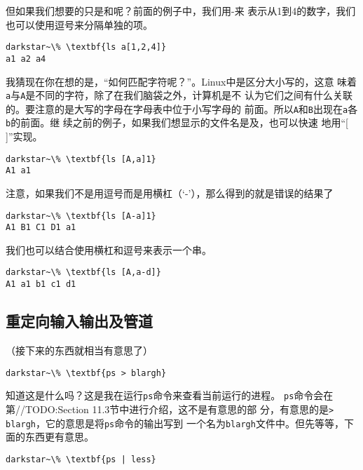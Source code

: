 但如果我们想要的只是和呢？前面的例子中，我们用-来
表示从1到4的数字，我们也可以使用逗号来分隔单独的项。
\begin{Verbatim}[frame=single, commandchars=\\\{\}]
darkstar~\% \textbf{ls a[1,2,4]}
a1 a2 a4
\end{Verbatim}

我猜现在你在想的是，``如何匹配字符呢？''。Linux中是区分大小写的，这意
味着\texttt{a}与\texttt{A}是不同的字符，除了在我们脑袋之外，计算机是不
认为它们之间有什么关联的。要注意的是大写的字母在字母表中位于小写字母的
前面。所以\texttt{A}和\texttt{B}出现在\texttt{a}各\texttt{b}的前面。继
续之前的例子，如果我们想显示的文件名是及，也可以快速
地用``[ ]''实现。
\begin{Verbatim}[frame=single, commandchars=\\\{\}]
darkstar~\% \textbf{ls [A,a]1}
A1 a1
\end{Verbatim}

注意，如果我们不是用逗号而是用横杠（`-'），那么得到的就是错误的结果了

\begin{Verbatim}[frame=single, commandchars=\\\{\}]
darkstar~\% \textbf{ls [A-a]1}
A1 B1 C1 D1 a1
\end{Verbatim}

我们也可以结合使用横杠和逗号来表示一个串。

\begin{Verbatim}[frame=single, commandchars=\\\{\}]
darkstar~\% \textbf{ls [A,a-d]}
A1 a1 b1 c1 d1
\end{Verbatim}


\subsection{重定向输入输出及管道}
\label{sec:shell:commandLine:redirectionAndPiping}
（接下来的东西就相当有意思了）
\begin{Verbatim}[frame=single, commandchars=\\\{\}]
darkstar~\% \textbf{ps > blargh}
\end{Verbatim}

知道这是什么吗？这是我在运行\texttt{ps}命令来查看当前运行的进程。
\texttt{ps}命令会在第//TODO:Section 11.3节中进行介绍，这不是有意思的部
分，有意思的是\texttt{> blargh}，它的意思是将\texttt{ps}命令的输出写到
一个名为\texttt{blargh}文件中。但先等等，下面的东西更有意思。
\begin{Verbatim}[frame=single, commandchars=\\\{\}]
darkstar~\% \textbf{ps | less}
\end{Verbatim}

